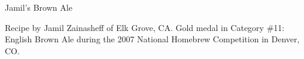 \documentclass[parskip=half,fontsize=9pt,oneside]{scrbook}
\begin{document}
\mainmatter


\begin{recipe}{Jamil's Brown Ale}

\begin{aboutblock}
Recipe by Jamil Zainasheff of Elk Grove, CA. Gold medal in Category \#11: English
Brown Ale during the 2007 National Homebrew Competition in Denver, CO.
\sourceaha
\end{aboutblock}


\begin{methodandtiming}

\begin{mashsteps}
\end{mashsteps}

\end{methodandtiming}

\recipebreak

\begin{ingredientsblock}

\begin{malts}
\end{malts}

\begin{hops}
\end{hops}


\end{ingredientsblock}

\end{recipe}


\end{document}
